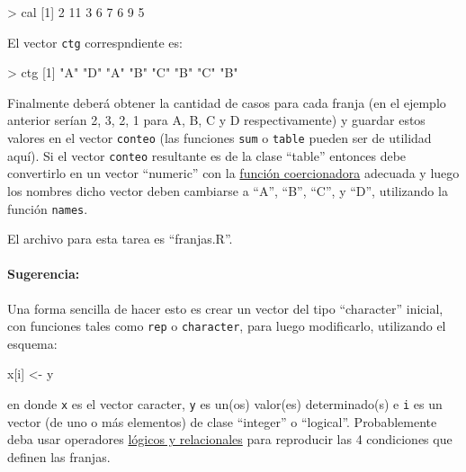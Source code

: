 \documentclass[]{article}
\newenvironment{Shaded}{}{}
\newcommand{\DecValTok}[1]{\textcolor[rgb]{0.25,0.63,0.44}{{#1}}}
\newcommand{\StringTok}[1]{\textcolor[rgb]{0.25,0.44,0.63}{{#1}}}
\newcommand{\NormalTok}[1]{{#1}}
\begin{document}
\begin{Shaded}
\begin{Highlighting}[]
\NormalTok{> cal}
\NormalTok{[}\DecValTok{1}\NormalTok{]  }\DecValTok{2} \DecValTok{11}  \DecValTok{3}  \DecValTok{6}  \DecValTok{7}  \DecValTok{6}  \DecValTok{9} \DecValTok{5}
\end{Highlighting}
\end{Shaded}
El vector \texttt{ctg} correspndiente es:

\begin{Shaded}
\begin{Highlighting}[]
\NormalTok{> ctg}
\NormalTok{[}\DecValTok{1}\NormalTok{] }\StringTok{"A"} \StringTok{"D"} \StringTok{"A"} \StringTok{"B"} \StringTok{"C"} \StringTok{"B"} \StringTok{"C"} \StringTok{"B"} 
\end{Highlighting}
\end{Shaded}
Finalmente deberá obtener la cantidad de casos para cada franja (en el
ejemplo anterior serían 2, 3, 2, 1 para A, B, C y D respectivamente) y
guardar estos valores en el vector \texttt{conteo} (las funciones
\texttt{sum} o \texttt{table} pueden ser de utilidad aquí). Si el vector
\texttt{conteo} resultante es de la clase ``table'' entonces debe
convertirlo en un vector ``numeric'' con la
\href{http://eva.universidad.edu.uy/file.php/1454/lecciones/2.6-identificadores-y-coercionadores.R}{función
coercionadora} adecuada y luego los nombres dicho vector deben cambiarse
a ``A'', ``B'', ``C'', y ``D'', utilizando la función \texttt{names}.

El archivo para esta tarea es ``franjas.R''.

\paragraph{Sugerencia:}

Una forma sencilla de hacer esto es crear un vector del tipo
``character'' inicial, con funciones tales como \texttt{rep} o
\texttt{character}, para luego modificarlo, utilizando el esquema:

\begin{Shaded}
\begin{Highlighting}[]
\NormalTok{x[i] <- y}
\end{Highlighting}
\end{Shaded}
en donde \texttt{x} es el vector caracter, \texttt{y} es un(os)
valor(es) determinado(s) e \texttt{i} es un vector (de uno o más
elementos) de clase ``integer'' o ``logical''. Probablemente deba usar
operadores
\href{http://eva.universidad.edu.uy/mod/resource/view.php?id=94745}{lógicos
y relacionales} para reproducir las 4 condiciones que definen las
franjas.
\end{document}
